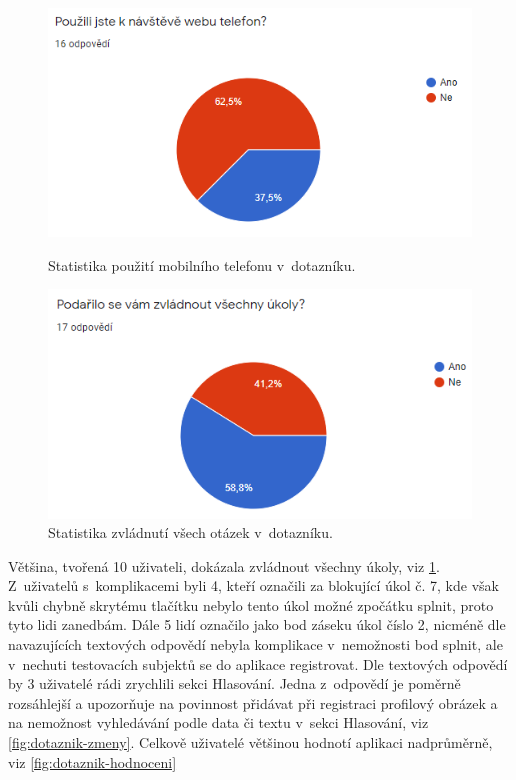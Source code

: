 \begin{figure}[!tbp]
  \centering
  \begin{minipage}[b]{0.45\textwidth}
    \includegraphics[width=\textwidth]{obrazky-figures/dotaznik-mobil.png}
    \caption{Statistika použití mobilního telefonu v~dotazníku.}
    \label{fig:dotaznik-mobil}
  \end{minipage}
  \hfill
  \begin{minipage}[b]{0.45\textwidth}
    \includegraphics[width=\textwidth]{obrazky-figures/dotaznik-vsechno.png}
    \caption{Statistika zvládnutí všech otázek v~dotazníku.}
    \label{fig:dotaznik-vsechno}
  \end{minipage}
\end{figure}

\par Většina, tvořená 10 uživateli, dokázala zvládnout všechny úkoly, viz \ref{fig:dotaznik-vsechno}. Z~uživatelů s~komplikacemi byli 4, kteří označili za blokující úkol č. 7, kde však kvůli chybně skrytému tlačítku nebylo tento úkol možné zpočátku splnit, proto tyto lidi zanedbám. Dále 5 lidí označilo jako bod záseku úkol číslo 2, nicméně dle navazujících textových odpovědí nebyla komplikace v~nemožnosti bod splnit, ale v~nechuti testovacích subjektů se do aplikace registrovat. Dle textových odpovědí by 3 uživatelé rádi zrychlili sekci Hlasování. Jedna z~odpovědí je poměrně rozsáhlejší a upozorňuje na povinnost přidávat při registraci profilový obrázek a na nemožnost vyhledávání podle data či textu v~sekci Hlasování, viz \ref{fig:dotaznik-zmeny}. Celkově uživatelé většinou hodnotí aplikaci nadprůměrně, viz \ref{fig:dotaznik-hodnoceni}


